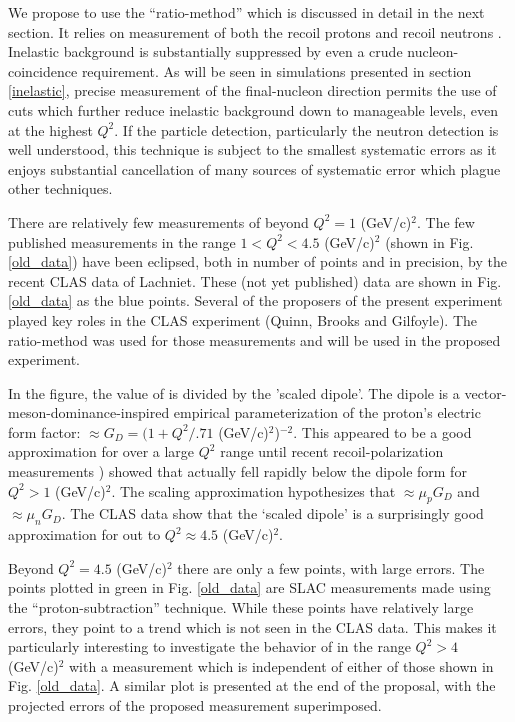 \documentclass[12pt,letterpaper,oneside]{article}
\begin{document}
We propose to use the ``ratio-method'' \cite{Durand} which is discussed in detail in the next section.  
It relies on measurement of both the recoil protons and recoil neutrons \cite{rat1,rat2,rat3,rat4,rat5,rat6,rat7,Will}.  
Inelastic background is substantially suppressed by even a crude nucleon-coincidence requirement.  
As will be seen in simulations
presented in section \ref{inelastic}, precise measurement of the
final-nucleon direction permits the use of cuts which further reduce
inelastic background down to manageable levels, even at the highest $Q^2$.
If the particle detection, particularly the neutron
detection is well understood, this technique is subject to the 
smallest systematic errors as it enjoys substantial cancellation of
many sources of systematic error which plague other techniques.

There are relatively few measurements of \gmn beyond $Q^2=1$ (GeV/c)$^2$.  
The few published measurements in the range $1<Q^2<4.5$
(GeV/c)$^2$ (shown in Fig. \ref{old_data}) have been eclipsed, both 
in number of points and in precision, by the recent CLAS data \cite{Will,Jeff} of
Lachniet.  
These (not yet published) data are shown in Fig. \ref{old_data} as the blue points.  
Several of the proposers of the present experiment played key roles in the CLAS experiment (Quinn,
Brooks and Gilfoyle).  
The ratio-method was used for those measurements and will be used in the proposed experiment.

In the figure, the value of \gmn is divided by the 'scaled dipole'.  The
dipole is a vector-meson-dominance-inspired empirical parameterization
of the proton's electric form factor: \gep $\approx G_D=(1+Q^2/.71$
(GeV/c)$^2$)$^{-2}$.  This appeared to be a good approximation for
\gep over a large $Q^2$ range until recent recoil-polarization 
measurements  \cite{jones,gayou}) showed that \gep actually 
fell rapidly below the
dipole form for $Q^2>1$ (GeV/c)$^2$.  The scaling approximation
hypothesizes that \gmp $\approx \mu_p G_D$ and \gmn $\approx \mu_n
G_D$.  The CLAS data show that the `scaled dipole' is a surprisingly
good approximation for \gmn out to $Q^2\approx 4.5$ (GeV/c)$^2$.

Beyond $Q^2=4.5$ (GeV/c)$^2$ there are only a 
few points, with large errors.  The
points plotted in green in Fig. \ref{old_data} are SLAC measurements
\cite{SLAC_Rock} made using the ``proton-subtraction'' technique.
While these points have relatively large
errors, they point to a trend which 
is not seen in 
the CLAS data.  This makes it particularly interesting to investigate
the behavior of  \gmn  in the range $Q^2>4$ (GeV/c)$^2$  with a
measurement which is independent of either of those shown in Fig.
\ref{old_data}.  A similar plot is presented at the end of the
proposal, with the projected errors of the proposed measurement superimposed.
\end{document}
